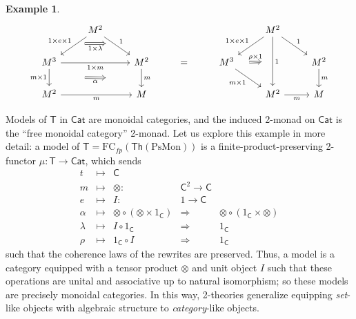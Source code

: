 \documentclass{amsart}
\theoremstyle{definition}
\newtheorem{example}[theorem]{Example}
\newcommand{\Th}{\mathsf{Th}}
\newcommand{\Cat}{\mathsf{Cat}}
\newcommand{\C}{\mathsf{C}}
\newcommand{\T}{\mathsf{T}}
\newcommand{\FC}{\mathrm{FC}}
\newcommand{\maps}{\colon}
\begin{document}
\begin{example}
      \[\begin{tikzcd}
          & M^2 \ar[dl,"1\times e\times 1",""name=a1,swap] \ar[dr,"1",""name=a2] \arrow[Rightarrow,from=a1,to=a2,"1\times \lambda",swap,shorten >=0.4cm,shorten <=0.4cm] & && & M^2 \ar[dl,"1\times e\times 1",swap] \ar[dr,"1"] \ar[dd,"1",""name=c1] & \\
          M^3 \ar[d,"m\times 1",swap,""name=b1] \ar[rr,"1\times m",swap] && M^2 \ar[d,"m",""name=b2] \arrow[Rightarrow,from=b1,to=b2,"\alpha",shorten >=1.3cm,shorten <=1.3cm,swap] & = & M^3 \ar[dr,"m\times 1",swap] \arrow[Rightarrow,to=c1,"\rho\times 1",shorten >=0.4cm,shorten <=0.4cm] && M^2 \ar[d,"m"] \\
          M^2 \ar[rr,"m",swap] && M &&& M^2 \ar[r,"m",swap] & M
        \end{tikzcd}\]
    \end{example}

Models of $\T$ in $\Cat$ are monoidal categories, and the induced 2-monad on $\Cat$ is the ``free monoidal category'' 2-monad. Let us explore this example in more detail: a model of $\T = \FC_{fp}(\Th(\mathrm{PsMon}))$ is a finite-product-preserving 2-functor $\mu\colon \T\to \Cat$, which sends 
\[\begin{array}{rclcl}
	t & \mapsto & \C &&\\
	m & \mapsto & \otimes\maps & \C^2 \to \C &\\
	e & \mapsto & I\maps & 1\to \C &\\
	\alpha & \mapsto & \otimes \circ (\otimes \times 1_\C) & \Rightarrow & \otimes \circ (1_\C \times \otimes)\\
	\lambda & \mapsto & I\circ 1_\C & \Rightarrow & 1_\C\\
	\rho & \mapsto & 1_\C \circ I & \Rightarrow & 1_\C
\end{array}\]
such that the coherence laws of the rewrites are preserved.  Thus, a model is a category equipped with a tensor product $\otimes$ and unit object $I$ such that these operations are unital and associative up to natural isomorphism; so these models are precisely monoidal categories. In this way, 2-theories generalize equipping \textit{set}-like objects with algebraic structure to \textit{category}-like objects.
\end{document}
